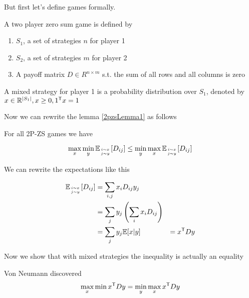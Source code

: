 But first let's define games formally.

\begin{Def}[2P-ZS Games] A two player zero sum game is defined by 
\begin{enumerate}
\item $S_1$, a set of strategies $n$ for player 1
\item $S_2$, a set of strategies $m$ for player 2
\item A payoff matrix $D\in R^{n\times m}$ s.t. the sum of all rows and all columns is zero %
\end{enumerate}
\end{Def}

\begin{Def} A mixed strategy for player 1 is a probability distribution over $S_1$, denoted by $x\in \mathbb{R}^{|S_1|}, x\geq 0, {1}^\text{\upshape \sffamily T} x=1$
\end{Def}

Now we can rewrite the lemma \ref{2pzsLemma1} as follows

\begin{lem} For all 2P-ZS games we have

\[\max_x\min_y\mathbb{E}_{{i\sim x}\atop {j\sim y}} [D_{ij}] \leq \min_y\max_x\mathbb{E}_{{i\sim x}\atop {j\sim y}} [D_{ij}]\]

\end{lem}

We can rewrite the expectations like this

\begin{align*}
\mathbb{E}_{{i\sim x}\atop {j\sim y}} [D_{ij}] &= \sum_{i,j} x_i D_{ij}y_j\\
	&=\sum_j y_j \left(\sum_i x_iD_{ij}\right)\\
	&=\sum_j y_j \mathbb{E}[x|y]
	&={x}^\text{\upshape \sffamily T} D y
\end{align*}

Now we show that with mixed strategies the inequality is actually an equality

\begin{thm} Von Neumann discovered
\[\max_x\min {x}^\text{\upshape \sffamily T}Dy = \min_y\max_x {x}^\text{\upshape \sffamily T} Dy\]
\end{thm}

